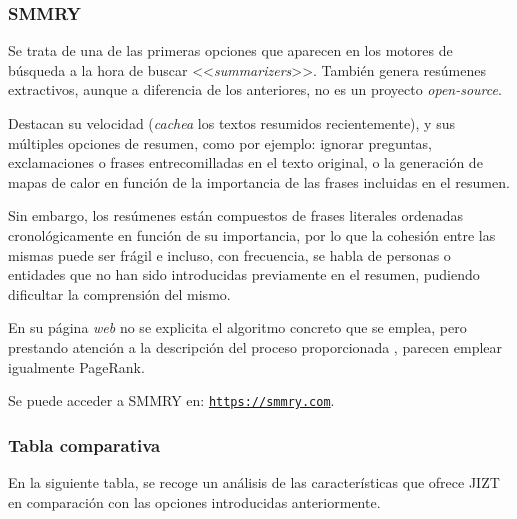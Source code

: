 \bigskip
\subsubsection{SMMRY}

Se trata de una de las primeras opciones que aparecen en los motores de búsqueda a la hora de buscar <<\emph{summarizers}>>. También genera resúmenes extractivos, aunque a diferencia de los anteriores, no es un proyecto \emph{open-source}.

Destacan su velocidad (\emph{cachea} los textos resumidos recientemente), y sus múltiples opciones de resumen, como por ejemplo: ignorar preguntas, exclamaciones o frases entrecomilladas en el texto original, o la generación de mapas de calor en función de la importancia de las frases incluidas en el resumen.

Sin embargo, los resúmenes están compuestos de frases literales ordenadas cronológicamente en función de su importancia, por lo que la cohesión entre las mismas puede ser frágil e incluso, con frecuencia, se habla de personas o entidades que no han sido introducidas previamente en el resumen, pudiendo dificultar la comprensión del mismo.

En su página \emph{web} no se explicita el algoritmo concreto que se emplea, pero prestando atención a la descripción del proceso proporcionada \cite{smmry}, parecen emplear igualmente PageRank.

Se puede acceder a SMMRY en:
\href{https://smmry.com}{\texttt{{\small https://smmry.com}}}.

\newpage
\subsubsection{Tabla comparativa}

En la siguiente tabla, se recoge un análisis de las características que ofrece JIZT en comparación con las opciones introducidas anteriormente.

